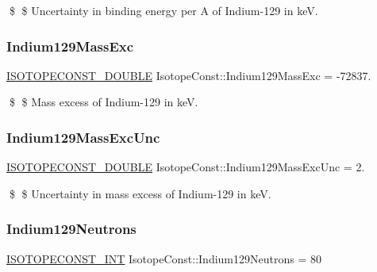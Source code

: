\$ \$ Uncertainty in binding energy per A of Indium-\/129 in keV. \mbox{\label{group___isotope_const-_indium-_in129_gab0c3c16902ff0d885c91074a89e5dbc2}} 
\subsubsection{\texorpdfstring{Indium129\+Mass\+Exc}{Indium129MassExc}}
{\footnotesize\ttfamily \mbox{\hyperlink{group___isotope_const-_macros_ga8f45a7272ce02c0b4c65c44636ed719a}{I\+S\+O\+T\+O\+P\+E\+C\+O\+N\+S\+T\+\_\+\+D\+O\+U\+B\+LE}} Isotope\+Const\+::\+Indium129\+Mass\+Exc = -\/72837.}

\$ \$ Mass excess of Indium-\/129 in keV. \mbox{\label{group___isotope_const-_indium-_in129_ga8ed2ad362e751915d6dd349197967361}} 
\subsubsection{\texorpdfstring{Indium129\+Mass\+Exc\+Unc}{Indium129MassExcUnc}}
{\footnotesize\ttfamily \mbox{\hyperlink{group___isotope_const-_macros_ga8f45a7272ce02c0b4c65c44636ed719a}{I\+S\+O\+T\+O\+P\+E\+C\+O\+N\+S\+T\+\_\+\+D\+O\+U\+B\+LE}} Isotope\+Const\+::\+Indium129\+Mass\+Exc\+Unc = 2.}

\$ \$ Uncertainty in mass excess of Indium-\/129 in keV. \mbox{\label{group___isotope_const-_indium-_in129_gabe68960e5344a8f26037a8ddcf7764d1}} 
\subsubsection{\texorpdfstring{Indium129\+Neutrons}{Indium129Neutrons}}
{\footnotesize\ttfamily \mbox{\hyperlink{group___isotope_const-_macros_ga5f18360b3e99483a35c32d789e62621c}{I\+S\+O\+T\+O\+P\+E\+C\+O\+N\+S\+T\+\_\+\+I\+NT}} Isotope\+Const\+::\+Indium129\+Neutrons = 80}

